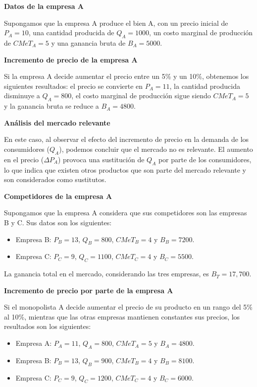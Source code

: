 \documentclass[
  letterpaper,
  DIV=11,
  numbers=noendperiod]{scrartcl}
\providecommand{\tightlist}{%
  \setlength{\itemsep}{0pt}\setlength{\parskip}{0pt}}\usepackage{longtable,booktabs,array}
\begin{document}
\textbf{Datos de la empresa A}

Supongamos que la empresa A produce el bien A, con un precio inicial de
\(P_A = 10\), una cantidad producida de \(Q_A = 1000\), un costo
marginal de producción de \(CMeT_A = 5\) y una ganancia bruta de
\(B_A = 5000\).

\textbf{Incremento de precio de la empresa A}

Si la empresa A decide aumentar el precio entre un 5\% y un 10\%,
obtenemos los siguientes resultados: el precio se convierte en
\(P_A = 11\), la cantidad producida disminuye a \(Q_A = 800\), el costo
marginal de producción sigue siendo \(CMeT_A = 5\) y la ganancia bruta
se reduce a \(B_A = 4800\).

\textbf{Análisis del mercado relevante}

En este caso, al observar el efecto del incremento de precio en la
demanda de los consumidores (\(Q_A\)), podemos concluir que el mercado
no es relevante. El aumento en el precio (\(\Delta P_A\)) provoca una
sustitución de \(Q_A\) por parte de los consumidores, lo que indica que
existen otros productos que son parte del mercado relevante y son
considerados como sustitutos.

\textbf{Competidores de la empresa A}

Supongamos que la empresa A considera que sus competidores son las
empresas B y C. Sus datos son los siguientes:

\begin{itemize}
\tightlist
\item
  Empresa B: \(P_B = 13\), \(Q_B = 800\), \(CMeT_B = 4\) y
  \(B_B = 7200\).
\item
  Empresa C: \(P_C = 9\), \(Q_C = 1100\), \(CMeT_C = 4\) y
  \(B_C = 5500\).
\end{itemize}

La ganancia total en el mercado, considerando las tres empresas, es
\(B_T = 17,700\).

\textbf{Incremento de precio por parte de la empresa A}

Si el monopolista A decide aumentar el precio de su producto en un rango
del 5\% al 10\%, mientras que las otras empresas mantienen constantes
sus precios, los resultados son los siguientes:

\begin{itemize}
\tightlist
\item
  Empresa A: \(P_A = 11\), \(Q_A = 800\), \(CMeT_A = 5\) y
  \(B_A = 4800\).
\item
  Empresa B: \(P_B = 13\), \(Q_B = 900\), \(CMeT_B = 4\) y
  \(B_B = 8100\).
\item
  Empresa C: \(P_C = 9\), \(Q_C = 1200\), \(CMeT_C = 4\) y
  \(B_C = 6000\).
\end{itemize}
\end{document}
